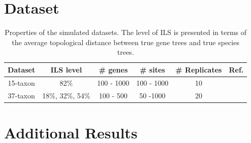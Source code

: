 \documentclass[runningheads]{llncs}
\begin{document}
\begin{appendices}



\vspace{-30pt}
\section{Dataset}
\label{app:dataset}
\vspace{-22pt}
\begin{table}[htbp]
\caption{Properties of the simulated datasets. The level of ILS is presented in terms of the average topological distance between true gene trees and true species trees.}
\label{table.data-description}
\centering
\begin{tabular}{c c c c c c} 
 \hline
 Dataset & ILS level & \# genes & \# sites & \# Replicates & Ref.\\  [0.5ex]
 \hline\hline
 15-taxon & 82\% & 100 - 1000 & 100 - 1000 & 10 & \cite{bayzid2015weighted}\\
 \hline
 37-taxon & 18\%, 32\%, 54\% & 100 - 500 & 50 -1000 & 20 & \cite{statistical-binning}\\
 \hline
 
\end{tabular}
\end{table}

\clearpage
\section{Additional Results}
\label{app:additional-results}


\end{appendices}
\end{document}
